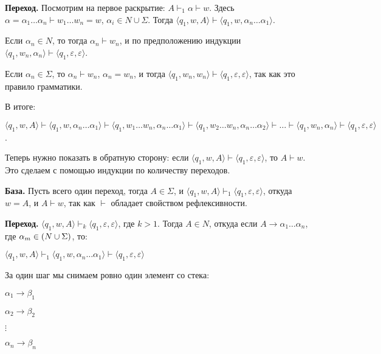 \textbf{Переход.} Посмотрим на первое раскрытие: $A \vdash_1 \alpha \vdash w$. Здесь $\alpha = \alpha_1 \dots \alpha_n \vdash w_1 \dots w_n = w$, $\alpha_i \in N \cup \Sigma$. Тогда $\langle q_1, w, A \rangle \vdash \langle q_1, w, \alpha_n \dots \alpha_1 \rangle$.

Если $\alpha_n \in N$, то тогда $\alpha_n \vdash w_n$, и по предположению индукции $\langle q_1, w_n, \alpha_n \rangle \vdash \langle q_1, \varepsilon, \varepsilon \rangle$.

Если $\alpha_n \in \Sigma$, то $\alpha_n \vdash w_n$, $\alpha_n = w_n$, и тогда $\langle q_1, w_n, w_n \rangle \vdash \langle q_1, \varepsilon, \varepsilon \rangle$, так как это правило грамматики.

В итоге:

\begin{center}
    $\langle q_1, w, A \rangle \vdash \langle q_1, w, \alpha_n \dots \alpha_1 \rangle \vdash \langle q_1, w_1 \dots w_n, \alpha_n \dots \alpha_1 \rangle \vdash \langle q_1, w_2 \dots w_n, \alpha_n \dots \alpha_2 \rangle \vdash \dots \vdash \langle q_1, w_n, \alpha_n \rangle \vdash \langle q_1, \varepsilon, \varepsilon \rangle$.
\end{center}

Теперь нужно показать в обратную сторону: если $\langle q_1, w, A \rangle \vdash \langle q_1, \varepsilon, \varepsilon \rangle$, то $A \vdash w$. Это сделаем с помощью индукции по количеству переходов.


\textbf{База.} Пусть всего один переход, тогда $A \in \Sigma$, и $\langle q_1, w, A \rangle \vdash_1 \langle q_1, \varepsilon, \varepsilon \rangle$, откуда $w = A$, и $A \vdash w$, так как $\vdash$ обладает свойством рефлексивности.

\textbf{Переход.} $\langle q_1, w, A \rangle \vdash_k \langle q_1, \varepsilon, \varepsilon \rangle$, где $k > 1$. Тогда $A \in N$, откуда если $A \rightarrow \alpha_1 \dots \alpha_n$, где $\alpha_m \in \left({N \cup \Sigma}\right)$, то:

\begin{center}
    $\langle q_1, w, A \rangle \vdash_1 \langle q_1, w, \alpha_n \dots \alpha_1 \rangle \vdash \langle q_1, \varepsilon, \varepsilon \rangle$
\end{center}

\Note За один шаг мы снимаем ровно один элемент со стека:

\begin{center}
    $\alpha_1 \rightarrow \beta_1$
    
    $\alpha_2 \rightarrow \beta_2$
    
    $\vdots$
    
    $\alpha_n \rightarrow \beta_n$
\end{center}

